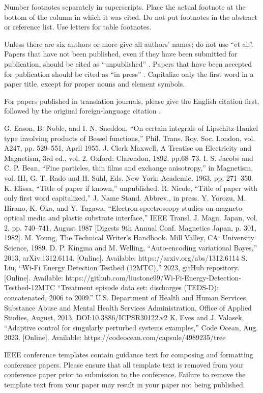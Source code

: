 \documentclass[conference]{IEEEtran}
\begin{document}
Number footnotes separately in superscripts. Place the actual footnote at 
the bottom of the column in which it was cited. Do not put footnotes in the 
abstract or reference list. Use letters for table footnotes.

Unless there are six authors or more give all authors' names; do not use 
``et al.''. Papers that have not been published, even if they have been 
submitted for publication, should be cited as ``unpublished'' \cite{b4}. Papers 
that have been accepted for publication should be cited as ``in press'' \cite{b5}. 
Capitalize only the first word in a paper title, except for proper nouns and 
element symbols.

For papers published in translation journals, please give the English 
citation first, followed by the original foreign-language citation \cite{b6}.

\begin{thebibliography}{00}
 G. Eason, B. Noble, and I. N. Sneddon, ``On certain integrals of Lipschitz-Hankel type involving products of Bessel functions,'' Phil. Trans. Roy. Soc. London, vol. A247, pp. 529--551, April 1955.
 J. Clerk Maxwell, A Treatise on Electricity and Magnetism, 3rd ed., vol. 2. Oxford: Clarendon, 1892, pp.68--73.
 I. S. Jacobs and C. P. Bean, ``Fine particles, thin films and exchange anisotropy,'' in Magnetism, vol. III, G. T. Rado and H. Suhl, Eds. New York: Academic, 1963, pp. 271--350.
 K. Elissa, ``Title of paper if known,'' unpublished.
 R. Nicole, ``Title of paper with only first word capitalized,'' J. Name Stand. Abbrev., in press.
 Y. Yorozu, M. Hirano, K. Oka, and Y. Tagawa, ``Electron spectroscopy studies on magneto-optical media and plastic substrate interface,'' IEEE Transl. J. Magn. Japan, vol. 2, pp. 740--741, August 1987 [Digests 9th Annual Conf. Magnetics Japan, p. 301, 1982].
 M. Young, The Technical Writer's Handbook. Mill Valley, CA: University Science, 1989.
 D. P. Kingma and M. Welling, ``Auto-encoding variational Bayes,'' 2013, arXiv:1312.6114. [Online]. Available: https://arxiv.org/abs/1312.6114
 S. Liu, ``Wi-Fi Energy Detection Testbed (12MTC),'' 2023, gitHub repository. [Online]. Available: https://github.com/liustone99/Wi-Fi-Energy-Detection-Testbed-12MTC
 ``Treatment episode data set: discharges (TEDS-D): concatenated, 2006 to 2009.'' U.S. Department of Health and Human Services, Substance Abuse and Mental Health Services Administration, Office of Applied Studies, August, 2013, DOI:10.3886/ICPSR30122.v2
 K. Eves and J. Valasek, ``Adaptive control for singularly perturbed systems examples,'' Code Ocean, Aug. 2023. [Online]. Available: https://codeocean.com/capsule/4989235/tree
\end{thebibliography}

\vspace{12pt}
\color{red}
IEEE conference templates contain guidance text for composing and formatting conference papers. Please ensure that all template text is removed from your conference paper prior to submission to the conference. Failure to remove the template text from your paper may result in your paper not being published.
\end{document}

